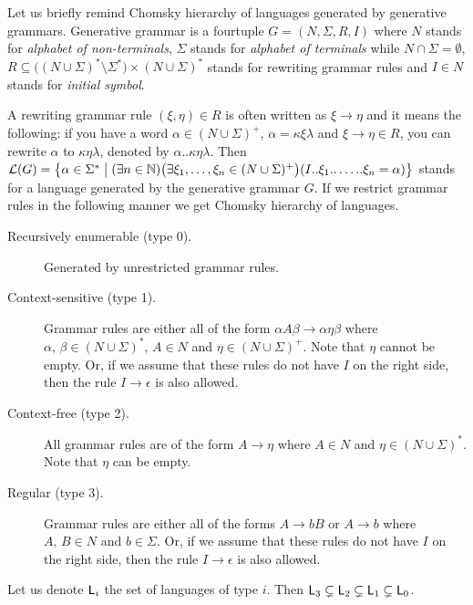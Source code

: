 		Let us briefly remind Chomsky hierarchy of languages generated by generative grammars. Generative grammar is a fourtuple $G = (N, \Sigma, R, I)$ where $N$ stands for {\em alphabet of non-terminals}, $\Sigma$ stands for {\em alphabet of terminals} while $N\cap\Sigma = \emptyset$, $R\subseteq\bigl((N\cup\Sigma)^*\setminus\Sigma^*\bigr) \times (N\cup\Sigma)^*$ stands for rewriting grammar rules and $I\in N$ stands for {\em initial symbol}.
		
		A rewriting grammar rule $(\xi,\eta)\in R$ is often written as $\xi\rightarrow\eta$ and it means the following: if you have a word $\alpha\in(N\cup\Sigma)^+$, $\alpha = \kappa\xi\lambda$ and $\xi\rightarrow\eta\in R$, you can rewrite $\alpha$ to $\kappa\eta\lambda$, denoted by $\alpha..\kappa\eta\lambda$.   %
		Then ${\cal L}(G) = \bigl\{ \alpha\in\Sigma^* \bigm| (\exists n\in\mathbb{N})\bigl(\exists \xi_1, \ldots, \xi_n \in(N\cup\Sigma)^+\bigr)(I..\xi_1..\ldots..\xi_n=\alpha) \bigr\}$ stands for a language generated by the generative grammar $G$. If we restrict grammar rules in the following manner we get Chomsky hierarchy of languages.
		\begin{description}
			\item[Recursively enumerable (type 0).] Generated by unrestricted grammar rules.
			\item[Context-sensitive (type 1).] Grammar rules are either all of the form $\alpha A \beta \rightarrow \alpha \eta \beta$ where $\alpha,\,\beta\in (N\cup\Sigma)^*$, $A\in N$ and $\eta\in (N\cup\Sigma)^+$. Note that $\eta$ cannot be empty. Or, if we assume that these rules do not have $I$ on the right side, then the rule $I\rightarrow \epsilon$ is also allowed.
			\item[Context-free (type 2).] All grammar rules are of the form $A\rightarrow\eta$ where $A\in N$ and $\eta\in (N\cup\Sigma)^*$. Note that $\eta$ can be empty.
			\item[Regular (type 3).] Grammar rules are either all of the forms $A\rightarrow bB$ or $A\rightarrow b$ where $A,\,B\in N$ and $b\in\Sigma$. Or, if we assume that these rules do not have $I$ on the right side, then the rule $I\rightarrow \epsilon$ is also allowed.
		\end{description}
		
		\begin{thm}
			Let us denote ${\sf L}_i$ the set of languages of type $i$. Then ${\sf L}_3\subsetneq{\sf L}_2\subsetneq{\sf L}_1\subsetneq{\sf L}_0$. 
		\end{thm}
		
